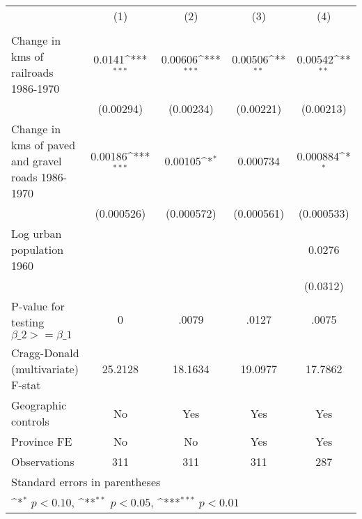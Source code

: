 {
\def\sym#1{\ifmmode^{#1}\else\(^{#1}\)\fi}
\begin{tabular}{l*{4}{c}}
\hline\hline
                &\multicolumn{1}{c}{(1)}&\multicolumn{1}{c}{(2)}&\multicolumn{1}{c}{(3)}&\multicolumn{1}{c}{(4)}\\
                &\multicolumn{1}{c}{}&\multicolumn{1}{c}{}&\multicolumn{1}{c}{}&\multicolumn{1}{c}{}\\
\hline
Change in kms of railroads 1986-1970&   0.0141\sym{***}&  0.00606\sym{***}&  0.00506\sym{**} &  0.00542\sym{**} \\
                &(0.00294)         &(0.00234)         &(0.00221)         &(0.00213)         \\
[1em]
Change in kms of paved and gravel roads 1986-1970&  0.00186\sym{***}&  0.00105\sym{*}  & 0.000734         & 0.000884\sym{*}  \\
                &(0.000526)         &(0.000572)         &(0.000561)         &(0.000533)         \\
[1em]
Log urban population 1960&                  &                  &                  &   0.0276         \\
                &                  &                  &                  & (0.0312)         \\
\hline
P-value for testing $\beta\_{2} >= \beta\_{1}$&        0         &    .0079         &    .0127         &    .0075         \\
Cragg-Donald (multivariate) F-stat&  25.2128         &  18.1634         &  19.0977         &  17.7862         \\
Geographic controls&       No         &      Yes         &      Yes         &      Yes         \\
Province FE     &       No         &       No         &      Yes         &      Yes         \\
Observations    &      311         &      311         &      311         &      287         \\
\hline\hline
\multicolumn{5}{l}{\footnotesize Standard errors in parentheses}\\
\multicolumn{5}{l}{\footnotesize \sym{*} \(p<0.10\), \sym{**} \(p<0.05\), \sym{***} \(p<0.01\)}\\
\end{tabular}
}
